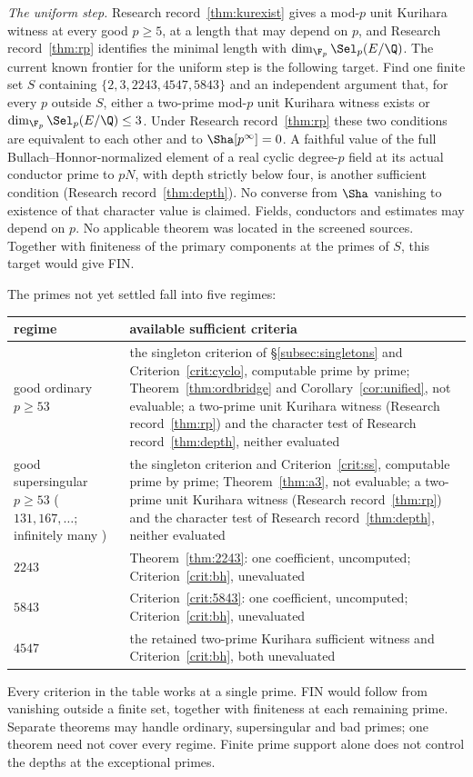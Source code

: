 \emph{The uniform step.} Research record~\ref{thm:kurexist} gives a mod-$p$ unit Kurihara witness at every good $p\ge5$, at a length that may depend on $p$, and Research record~\ref{thm:rp} identifies the minimal length with $\dim_{\F_p}\Sel_p(E/\Q)$. The current known frontier for the uniform step is the following target. Find one finite set $S$ containing $\{2,3,2243,4547,5843\}$ and an independent argument that, for every $p$ outside $S$, either a two-prime mod-$p$ unit Kurihara witness exists or $\dim_{\F_p}\Sel_p(E/\Q)\le3$. Under Research record~\ref{thm:rp} these two conditions are equivalent to each other and to $\Sha[p^\infty]=0$. A faithful value of the full Bullach--Honnor-normalized element of a real cyclic degree-$p$ field at its actual conductor prime to $pN$, with depth strictly below four, is another sufficient condition (Research record~\ref{thm:depth}). No converse from $\Sha$ vanishing to existence of that character value is claimed. Fields, conductors and estimates may depend on $p$. No applicable theorem was located in the screened sources. Together with finiteness of the primary components at the primes of $S$, this target would give FIN.

The primes not yet settled fall into five regimes:

\begin{center}
\begin{tabular}{@{}p{}p{}@{}}
\toprule
regime & available sufficient criteria\\ \midrule
good ordinary $p\ge53$ & the singleton criterion of \S\ref{subsec:singletons} and Criterion~\ref{crit:cyclo}, computable prime by prime; Theorem~\ref{thm:ordbridge} and Corollary~\ref{cor:unified}, not evaluable; a two-prime unit Kurihara witness (Research record~\ref{thm:rp}) and the character test of Research record~\ref{thm:depth}, neither evaluated\\
good supersingular $p\ge53$ ($131,167,\dots$; infinitely many \cite{elkies}) & the singleton criterion and Criterion~\ref{crit:ss}, computable prime by prime; Theorem~\ref{thm:a3}, not evaluable; a two-prime unit Kurihara witness (Research record~\ref{thm:rp}) and the character test of Research record~\ref{thm:depth}, neither evaluated\\
$2243$ & Theorem~\ref{thm:2243}: one coefficient, uncomputed; Criterion~\ref{crit:bh}, unevaluated\\
$5843$ & Criterion~\ref{crit:5843}: one coefficient, uncomputed; Criterion~\ref{crit:bh}, unevaluated\\
$4547$ & the retained two-prime Kurihara sufficient witness and Criterion~\ref{crit:bh}, both unevaluated\\ \bottomrule
\end{tabular}
\end{center}
Every criterion in the table works at a single prime. FIN would follow from vanishing outside a finite set, together with finiteness at each remaining prime. Separate theorems may handle ordinary, supersingular and bad primes; one theorem need not cover every regime. Finite prime support alone does not control the depths at the exceptional primes.

